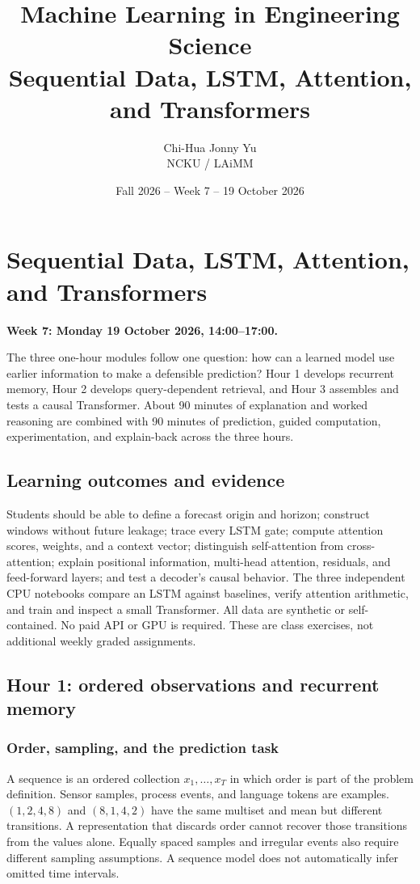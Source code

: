 \documentclass[11pt,oneside]{book}
\title{Machine Learning in Engineering Science\\Sequential Data, LSTM, Attention, and Transformers}
\author{Chi-Hua Jonny Yu\\NCKU / LAiMM}
\date{Fall 2026 -- Week 7 -- 19 October 2026}
\newcommand{\courseweek}[1]{\textbf{#1}}
\begin{document}
\maketitle
\tableofcontents
\chapter{Sequential Data, LSTM, Attention, and Transformers}
\label{chap:sequences-attention}
\courseweek{Week 7: Monday 19 October 2026, 14:00--17:00.}

The three one-hour modules follow one question: how can a learned model use
earlier information to make a defensible prediction? Hour 1 develops recurrent
memory, Hour 2 develops query-dependent retrieval, and Hour 3 assembles and
tests a causal Transformer. About 90 minutes of explanation and worked
reasoning are combined with 90 minutes of prediction, guided computation,
experimentation, and explain-back across the three hours.

\section{Learning outcomes and evidence}
Students should be able to define a forecast origin and horizon; construct
windows without future leakage; trace every LSTM gate; compute attention
scores, weights, and a context vector; distinguish self-attention from
cross-attention; explain positional information, multi-head attention,
residuals, and feed-forward layers; and test a decoder's causal behavior.
The three independent CPU notebooks compare an LSTM against baselines,
verify attention arithmetic, and train and inspect a small Transformer.
All data are synthetic or self-contained. No paid API or GPU is required.
These are class exercises, not additional weekly graded assignments.

\section{Hour 1: ordered observations and recurrent memory}
\subsection{Order, sampling, and the prediction task}
A sequence is an ordered collection $x_1,\ldots,x_T$ in which order is part
of the problem definition. Sensor samples, process events, and language
tokens are examples. $(1,2,4,8)$ and $(8,1,4,2)$ have the same multiset and
mean but different transitions. A representation that discards order
cannot recover those transitions from the values alone. Equally spaced
samples and irregular events also require different sampling assumptions.
A sequence model does not automatically infer omitted time intervals.
\end{document}
